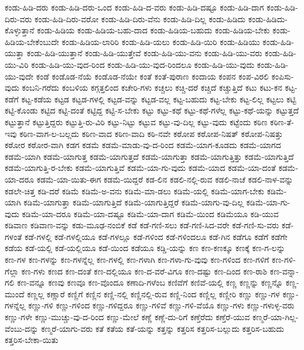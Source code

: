 {ಕಂಡು-ಹಿಡಿ-ದರು
ಕಂಡು-ಹಿಡಿ-ದರು-ಒಂದ
ಕಂಡು-ಹಿಡಿ-ದ-ವರು
ಕಂಡು-ಹಿಡಿ-ದಷ್ಟೂ
ಕಂಡು-ಹಿಡಿ-ದಾಗ
ಕಂಡು-ಹಿಡಿ-ದಿರು-ವರು
ಕಂಡು-ಹಿಡಿ-ದಿರು-ವರೋ
ಕಂಡು-ಹಿಡಿ-ದಿರು-ವೆನು
ಕಂಡು-ಹಿಡಿ-ದಿಲ್ಲ
ಕಂಡು-ಹಿಡಿದು
ಕಂಡು-ಹಿಡಿದು-ಕೊಳ್ಳುತ್ತಾನೆ
ಕಂಡು-ಹಿಡಿಯ
ಕಂಡು-ಹಿಡಿಯ-ಬಹು-ದಾದ
ಕಂಡು-ಹಿಡಿಯ-ಬಹುದು
ಕಂಡು-ಹಿಡಿಯ-ಬೇಕು
ಕಂಡು-ಹಿಡಿಯ-ಬೇಕೆಂಬುದೇ
ಕಂಡು-ಹಿಡಿಯ-ಲಾರಿರಿ
ಕಂಡು-ಹಿಡಿ-ಯಲು
ಕಂಡು-ಹಿಡಿ-ಯಿರಿ
ಕಂಡು-ಹಿಡಿಯು
ಕಂಡು-ಹಿಡಿ-ಯುತ್ತಾ
ಕಂಡು-ಹಿಡಿ-ಯುತ್ತಾನೆ
ಕಂಡು-ಹಿಡಿ-ಯುತ್ತೇವೆ
ಕಂಡು-ಹಿಡಿ-ಯು-ವನು
ಕಂಡು-ಹಿಡಿ-ಯು-ವರು
ಕಂಡು-ಹಿಡಿ-ಯು-ವಿರಿ
ಕಂಡು-ಹಿಡಿ-ಯು-ವುದ-ರಿಂದ
ಕಂಡು-ಹಿಡಿ-ಯು-ವುದ-ರಿಂದಲೂ
ಕಂಡು-ಹಿಡಿ-ಯು-ವುದು
ಕಂಡು-ಹಿಡಿ-ಯು-ವುದೇ
ಕಂಡೆ
ಕಂಡೊಡ-ನೆಯೆ
ಕಂಡೊಡ-ನೆಯೇ
ಕಂತೆ
ಕಂತೆ-ಪುರಾಣ
ಕಂದಾಯ
ಕಂಪನ
ಕಂಪ-ವಿರಲಿ
ಕಂಪಿಸು-ವುದು
ಕಂಬನಿ-ಗರೆದು
ಕಂಬಳಿಯ
ಕಗ್ಗತ್ತಲಿಂದ
ಕಚೇರಿ-ಗಳು
ಕಚ್ಚಲು
ಕಚ್ಚಿ-ದರೆ
ಕಚ್ಚಿದೆ
ಕಚ್ಚುತ್ತಿದೆ
ಕಟು
ಕಟು-ಕನ
ಕಟ್ಟ-ಕಡೆಗೆ
ಕಟ್ಟ-ಕಡೆಯ
ಕಟ್ಟಡ
ಕಟ್ಟಡ-ಗಳಲ್ಲಿ
ಕಟ್ಟಡ-ವನ್ನು
ಕಟ್ಟಡ-ವಲ್ಲ
ಕಟ್ಟ-ಬಹುದು
ಕಟ್ಟ-ಬೇಕು
ಕಟ್ಟ-ಲಿಲ್ಲ
ಕಟ್ಟಲು
ಕಟ್ಟಿ
ಕಟ್ಟಿ-ಕೊಂಡು
ಕಟ್ಟಿದ
ಕಟ್ಟಿ-ದಂತೆ
ಕಟ್ಟಿದ್ದ
ಕಟ್ಟಿ-ಸ-ಬೇಕು
ಕಟ್ಟು
ಕಟ್ಟು-ಕಥೆ
ಕಟ್ಟು-ಕಥೆ-ಗಳೆಲ್ಲ
ಕಟ್ಟು-ಕಥೆ-ಯನ್ನು
ಕಟ್ಟುತ್ತದೆ
ಕಟ್ಟುತ್ತಾನೆ
ಕಟ್ಟುತ್ತಿದ್ದರು
ಕಟ್ಟುತ್ತಿ-ರು-ವಿರಿ
ಕಟ್ಟು-ನಿಟ್ಟು
ಕಟ್ಟುವ
ಕಟ್ಟು-ವು-ದಿಲ್ಲ
ಕಟ್ಟು-ವುದು
ಕಟ್ಟೆಂದು
ಕಠಿಣ
ಕಠಿಣ-ತೆ-ಇವು
ಕಠಿಣ-ವಾಗ-ಲ-ಬಲ್ಲದು
ಕಠಿಣ-ವಾದ
ಕಠಿಣ-ವಾದಿ
ಕಠಿ-ನವೇ
ಕಠೋಪ
ಕಠೋಪ-ನಿಷತ್
ಕಠೋಪ-ನಿಷತ್ತು
ಕಠೋರ
ಕಠೋರ-ವಾಗಿ
ಕಡಗ
ಕಡಮೆ
ಕಡಮೆ-ಮಾಡು-ವು-ದ-ರಿಂದ
ಕಡಮೆ-ಯಾಗ-ಕೂಡದು
ಕಡಮೆ-ಯಾಗದ
ಕಡಮೆ-ಯಾಗಿ
ಕಡಮೆ-ಯಾಗುತ್ತ
ಕಡಮೆ-ಯಾಗುತ್ತದೆ
ಕಡಮೆ-ಯಾಗುತ್ತಾ
ಕಡಮೆ-ಯಾಗುತ್ತಿತ್ತು
ಕಡಮೆ-ಯಾಗುತ್ತಿದೆ
ಕಡಮೆ-ಯಾಗುತ್ತಿ-ರ-ಬೇಕು
ಕಡಮೆ-ಯಾಗುತ್ತಿವೆ
ಕಡಮೆ-ಯಾ-ಗು-ವುದು
ಕಡಮೆ-ಯಾದ
ಕಡಮೆ-ಯಾ-ದಂತೆ
ಕಡಮೆ-ಯಾ-ದರೂ
ಕಡಮೆ-ಯಾ-ಯಿತು-ಈಗ
ಕಡಮೆ-ಯಿದ್ದರೆ
ಕಡ-ಲಿನ
ಕಡಲಿ-ನಲ್ಲಿ-ರುವ
ಕಡಲಿ-ನಾಚೆ
ಕಡಲಿ-ನಾಳ-ವನ್ನು
ಕಡಲೇ-ಚಿತ್ತ
ಕಡಿ-ದರೆ
ಕಡಿಮೆ
ಕಡಿಮೆ-ಅ-ವನು
ಕಡಿಮೆ-ಮಾ-ಡಲು
ಕಡಿಮೆ-ಯಲ್ಲಿ
ಕಡಿಮೆ-ಯಾಗ-ಬೇಕು
ಕಡಿಮೆ-ಯಾಗಿ
ಕಡಿಮೆ-ಯಾಗುತ್ತಾ
ಕಡಿಮೆ-ಯಾಗುತ್ತಿದೆ
ಕಡಿಮೆ-ಯಾಗುತ್ತಿದ್ದರೆ
ಕಡಿಮೆ-ಯಾಗು-ವು-ದಿಲ್ಲ
ಕಡಿಮೆ-ಯಾ-ಗು-ವುದು
ಕಡಿಮೆ-ಯಾ-ದರೂ
ಕಡಿಮೆ-ಯಾ-ದಷ್ಟೂ
ಕಡಿಮೆ-ಯಾ-ದಾಗ
ಕಡಿಮೆ-ಯಿಂದ
ಕಡಿಮೆಯೂ
ಕಡಿ-ಯುವ
ಕಡಿವಾಣ
ಕಡಿವಾಣ-ವನ್ನು
ಕಡು-ಮೂಢ-ನಂಬಿಕೆ
ಕಡೆ
ಕಡೆ-ಗಣಿ-ಸಲು
ಕಡೆ-ಗಣಿ-ಸಿದ-ವರೇ
ಕಡೆ-ಗಣಿ-ಸು-ವರು
ಕಡೆ-ಗಳಂತೆ
ಕಡೆ-ಗಳಲ್ಲಿ
ಕಡೆ-ಗಳಲ್ಲಿಯೂ
ಕಡೆ-ಗಳಲ್ಲೂ
ಕಡೆ-ಗಳಿಂದ
ಕಡೆ-ಗಳಿಂದಲೂ
ಕಡೆ-ಗಿನ
ಕಡೆಗೂ
ಕಡೆಗೆ
ಕಡೆಗೇ
ಕಡೆಯ
ಕಡೆ-ಯಲ್ಲಿ
ಕಡೆ-ಯಲ್ಲಿಯೂ
ಕಡೆ-ಯಿಂದ
ಕಡೆಯೂ
ಕಡ್ಡಿ-ಯನ್ನು
ಕಣ
ಕಣ-ಕಣಕ್ಕೂ
ಕಣಕ್ಕೆ
ಕಣ-ಗ-ಲನ್ನು
ಕಣ-ಗಳ
ಕಣ-ಗಳನ್ನು
ಕಣ-ಗಳನ್ನೆಲ್ಲ
ಕಣ-ಗಳಲ್ಲಿ
ಕಣ-ಗಳಾಗಿ
ಕಣ-ಗಳಾ-ಗು-ವುವು
ಕಣ-ಗಳಿಂದ
ಕಣ-ಗಳಿಗೆ
ಕಣ-ಗಳಿ-ಗೆಲ್ಲಾ
ಕಣ-ಗಳು
ಕಣದ
ಕಣ-ದಂತೆ
ಕಣ-ದಲ್ಲಿಯೂ
ಕಣ-ದ-ವರೆ-ವಿಗೂ
ಕಣ-ದಷ್ಟು
ಕಣ-ದಿಂದ
ಕಣ-ರಾಶಿ
ಕಣ-ವನ್ನಾ-ಗಲಿ
ಕಣ-ವನ್ನೂ
ಕಣವು
ಕಣವೂ
ಕಣ-ವೊಂದೂ
ಕಣಾದಿ-ಗಳೆಂಬ
ಕಣಿವೆಗೆ
ಕಣಿವೆ-ಯಲ್ಲಿ
ಕಣ್ಣ
ಕಣ್ಣನ್ನು
ಕಣ್ಣನ್ನೊ
ಕಣ್ಣ-ಮುಂದೆ
ಕಣ್ಣಲ್ಲ
ಕಣ್ಣಾರೆ
ಕಣ್ಣಿಗೆ
ಕಣ್ಣಿನ
ಕಣ್ಣಿ-ನಲ್ಲಿ
ಕಣ್ಣಿನಲ್ಲಿ-ರುವ
ಕಣ್ಣಿ-ನಿಂದ
ಕಣ್ಣಿಲ್ಲ
ಕಣ್ಣೀರಿ
ಕಣ್ಣು
ಕಣ್ಣು-ಗಳ
ಕಣ್ಣು-ಗಳನ್ನೆಲ್ಲ
ಕಣ್ಣು-ಗಳಿ
ಕಣ್ಣು-ಗಳಿಂದ
ಕಣ್ಣು-ಗಳಿದ್ದರೂ
ಕಣ್ಣು-ಗಳಿವೆ
ಕಣ್ಣು-ಗಳಿ-ವೆಯೊ
ಕಣ್ಣು-ಗಳು
ಕಣ್ಣು-ಗಳುಳ್ಳ-ವರು
ಕಣ್ಣು-ಗಳೇ
ಕಣ್ಣು-ಮುಚ್ಚು-ವು-ದ-ರಿಂದ
ಕಣ್ಣು-ಮೇಲೆ
ಕಣ್ಣೆ
ಕಣ್ಣೆ-ದು-ರಿಗೆ
ಕಣ್ತೆರೆದು
ಕಣ್ತೆರೆ-ಯುವ
ಕಣ್ಮರೆ-ಯಾ-ಗಿಲ್ಲ-ವೆಂಬು-ದನ್ನು
ಕಣ್ಮರೆ-ಯಾಗು-ವರು
ಕತೆ
ಕತೆಯ
ಕತೆ-ಯನ್ನು
ಕತ್ತನ್ನು
ಕತ್ತರಿಸ
ಕತ್ತರಿಸ-ಬಲ್ಲುದು
ಕತ್ತರಿಸ-ಬಹುದು
ಕತ್ತರಿಸ-ಬೇಕಾ-ಯಿತು
}
